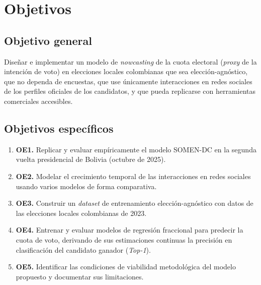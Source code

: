 

\chapter{Objetivos}\label{ch:objetivos}

\section{Objetivo general}

Diseñar e implementar un modelo de \textit{nowcasting} de la cuota electoral
(\textit{proxy} de la intención de voto) en elecciones locales colombianas
que sea elección-agnóstico, que no dependa de encuestas, que use únicamente
interacciones en redes sociales de los perfiles oficiales de los candidatos,
y que pueda replicarse con herramientas comerciales accesibles.

\section{Objetivos específicos}

\begin{enumerate}
  \item \textbf{OE1.} Replicar y evaluar empíricamente el modelo SOMEN-DC en
        la segunda vuelta presidencial de Bolivia (octubre de 2025).
  \item \textbf{OE2.} Modelar el crecimiento temporal de las interacciones en
        redes sociales usando varios modelos de forma comparativa.
  \item \textbf{OE3.} Construir un \textit{dataset} de entrenamiento
        elección-agnóstico con datos de las elecciones locales colombianas
        de 2023.
  \item \textbf{OE4.} Entrenar y evaluar modelos de regresión fraccional para predecir la cuota de voto, derivando de sus estimaciones continuas la precisión en clasificación del candidato ganador (\textit{Top-1}).
  \item \textbf{OE5.} Identificar las condiciones de viabilidad metodológica
        del modelo propuesto y documentar sus limitaciones.
\end{enumerate}
